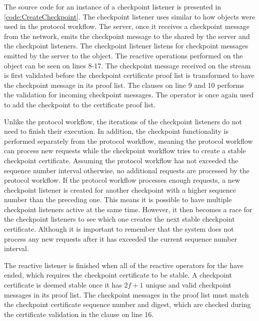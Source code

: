 \label{sec:checkpointList}
The source code for an instance of a checkpoint listener is presented in \autoref{code:CreateCheckpoint}. The checkpoint listener uses  similar to how  objects were used in the protocol workflow. The server, once it receives a checkpoint message from the network, emits the checkpoint message to the  shared by the server and the checkpoint listeners. The checkpoint listener listens for checkpoint messages emitted by the server to the  object. The reactive operations performed on the  object can be seen on lines 8-17. The checkpoint message received on the stream is first validated before the checkpoint certificate proof list is transformed to have the checkpoint message in its proof list. The  clauses on line 9 and 10 performs the validation for incoming checkpoint messages. The  operator is once again used to add the checkpoint to the certificate proof list. 

Unlike the protocol workflow, the iterations of the checkpoint listeners do not need to finish their execution. In addition, the checkpoint functionality is performed separately from the protocol workflow, meaning the protocol workflow can process new requests while the checkpoint workflow tries to create a stable checkpoint certificate. Assuming the protocol workflow has not exceeded the sequence number interval otherwise, no additional requests are processed by the protocol workflow.
If the protocol workflow processes enough requests, a new checkpoint listener is created for another checkpoint with a higher sequence number than the preceding one. This means it is possible to have multiple checkpoint listeners active at the same time. However, it then becomes a race for the checkpoint listeners to see which one creates the next stable checkpoint certificate. Although it is important to remember that the system does not process any new requests after it has exceeded the current sequence number interval. 

The reactive listener is finished when all of the reactive operators for the  have ended, which requires the checkpoint certificate to be stable. A checkpoint certificate is deemed stable once it has $2f+1$ unique and valid checkpoint messages in its proof list. The checkpoint messages in the proof list must match the checkpoint certificate sequence number and digest, which are checked during the certificate validation in the  clause on line 16.

